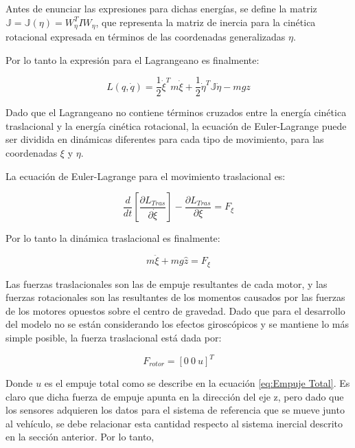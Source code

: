 \documentclass[../main.tex]{subfiles}
\begin{document}
Antes de enunciar las expresiones para dichas energías, se define
la matriz $\mathbb{J}=\mathbb{J}(\eta)=W_{\eta}^{T}IW_{\eta}$, que
representa la matriz de inercia para la cinética rotacional expresada
en términos de las coordenadas generalizadas $\eta$.

Por lo tanto la expresión para el Lagrangeano es finalmente:

\begin{equation}
L(q,\dot{q})=\frac{1}{2}\dot{\xi}^{T}m\dot{\xi}+\frac{1}{2}\dot{\eta}^{T}\mathbb{J}\dot{\eta}-mgz
\end{equation}

Dado que el Lagrangeano no contiene términos cruzados entre la energía
cinética traslacional y la energía cinética rotacional, la ecuación
de Euler-Lagrange puede ser dividida en dinámicas diferentes para
cada tipo de movimiento, para las coordenadas $\xi$ y $\eta$.

La ecuación de Euler-Lagrange para el movimiento traslacional es:

\begin{equation}
\frac{d}{dt}\left[\frac{\partial L_{Tras}}{\partial\dot{\xi}}\right]-\frac{\partial L_{Tras}}{\partial\xi}=F_{\xi}
\end{equation}


Por lo tanto la dinámica traslacional es finalmente:

\begin{equation}
m\ddot{\xi}+mg\hat{z}=F_{\xi}
\end{equation}

Las fuerzas traslacionales son las de empuje resultantes de cada motor,
y las fuerzas rotacionales son las resultantes de los momentos causados
por las fuerzas de los motores opuestos sobre el centro de gravedad.
Dado que para el desarrollo del modelo no se están considerando los
efectos giroscópicos y se mantiene lo más simple posible, la fuerza
traslacional está dada por:

\begin{equation}
F_{rotor}=[0\ 0\ u]^{T}
\end{equation}

Donde $u$ es el empuje total como se describe en la ecuación \ref{eq:Empuje Total}.
Es claro que dicha fuerza de empuje apunta en la dirección del eje
z, pero dado que los sensores adquieren los datos para el sistema
de referencia que se mueve junto al vehículo, se debe relacionar esta
cantidad respecto al sistema inercial descrito en la sección anterior.
Por lo tanto, 
\end{document}
